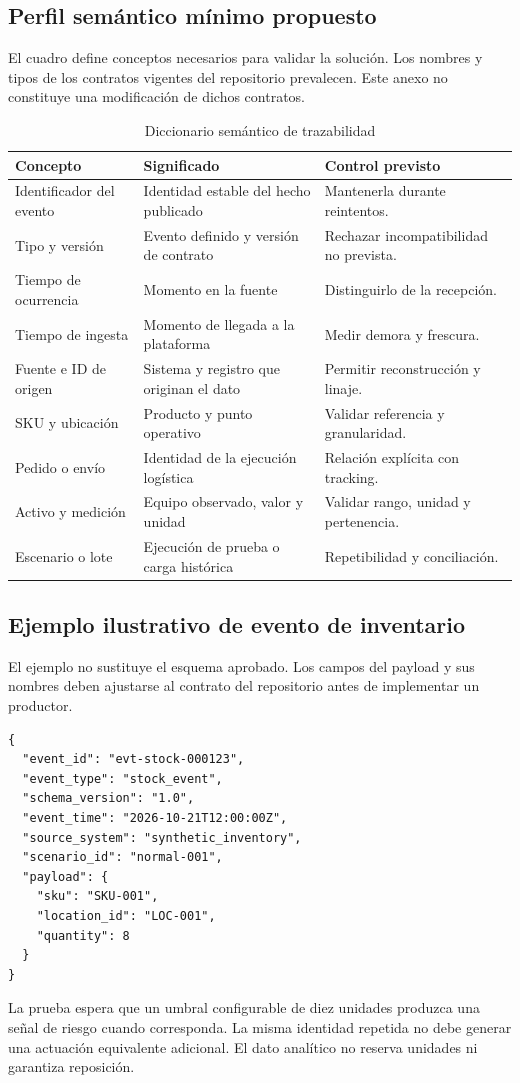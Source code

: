 \documentclass[11pt,a4paper]{article}
\begin{document}
\subsection{Perfil semántico mínimo propuesto}
El cuadro define conceptos necesarios para validar la solución. Los nombres y tipos de los contratos vigentes del repositorio prevalecen. Este anexo no constituye una modificación de dichos contratos.
\begin{table}[H]
\caption{Diccionario semántico de trazabilidad}\label{tab:diccionario}
\small\begin{tabularx}{\linewidth}{@{}P{.28\linewidth}YY@{}}\toprule
Concepto & Significado & Control previsto\\\midrule
Identificador del evento & Identidad estable del hecho publicado & Mantenerla durante reintentos.\\
Tipo y versión & Evento definido y versión de contrato & Rechazar incompatibilidad no prevista.\\
Tiempo de ocurrencia & Momento en la fuente & Distinguirlo de la recepción.\\
Tiempo de ingesta & Momento de llegada a la plataforma & Medir demora y frescura.\\
Fuente e ID de origen & Sistema y registro que originan el dato & Permitir reconstrucción y linaje.\\
SKU y ubicación & Producto y punto operativo & Validar referencia y granularidad.\\
Pedido o envío & Identidad de la ejecución logística & Relación explícita con tracking.\\
Activo y medición & Equipo observado, valor y unidad & Validar rango, unidad y pertenencia.\\
Escenario o lote & Ejecución de prueba o carga histórica & Repetibilidad y conciliación.\\\bottomrule
\end{tabularx}
\end{table}

\subsection{Ejemplo ilustrativo de evento de inventario}
El ejemplo no sustituye el esquema aprobado. Los campos del payload y sus nombres deben ajustarse al contrato del repositorio antes de implementar un productor.
\begin{lstlisting}
{
  "event_id": "evt-stock-000123",
  "event_type": "stock_event",
  "schema_version": "1.0",
  "event_time": "2026-10-21T12:00:00Z",
  "source_system": "synthetic_inventory",
  "scenario_id": "normal-001",
  "payload": {
    "sku": "SKU-001",
    "location_id": "LOC-001",
    "quantity": 8
  }
}
\end{lstlisting}
La prueba espera que un umbral configurable de diez unidades produzca una señal de riesgo cuando corresponda. La misma identidad repetida no debe generar una actuación equivalente adicional. El dato analítico no reserva unidades ni garantiza reposición.
\end{document}
